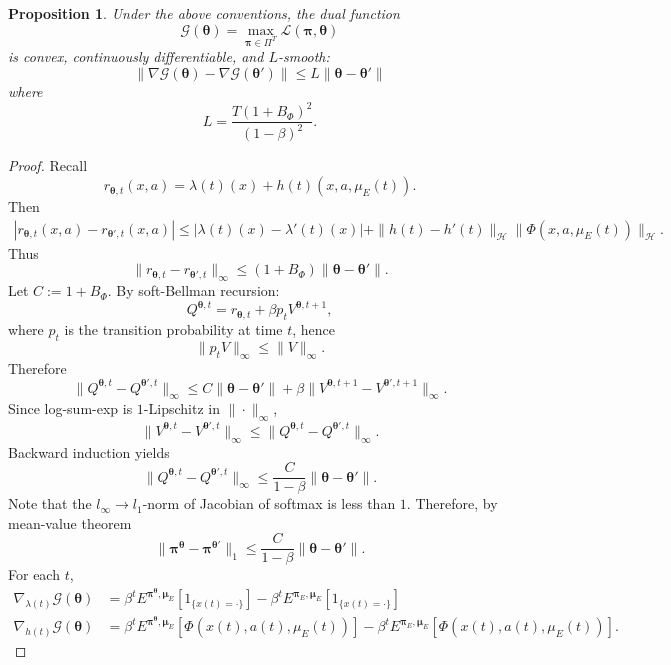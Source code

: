 \documentclass[11pt]{article}
\newcommand{\bmu}{{\boldsymbol \mu}}
\newcommand{\bpi}{{\boldsymbol \pi}}
\newtheorem{proposition}{Proposition}[section]
\begin{document}
\begin{proposition}
Under the above conventions, the dual function
\[
\mathcal G(\boldsymbol\theta)
=
\max_{\boldsymbol\pi\in\Pi^T}
\mathcal L(\boldsymbol\pi,\boldsymbol\theta)
\]
is convex, continuously differentiable, and $L$-smooth:
\[
\|\nabla\mathcal G(\boldsymbol\theta)
-
\nabla\mathcal G(\boldsymbol\theta')\|
\le
L
\|\boldsymbol\theta-\boldsymbol\theta'\|
\]
where 
\[ L = \frac{T(1+B_\Phi)^2}{(1-\beta)^2}. \]
\end{proposition}

\begin{proof}
Recall
\[
r_{\boldsymbol\theta,t}(x,a)
=
\lambda(t)(x)
+
h(t)(x,a,\mu_E(t)).
\]
Then
\begin{align*}
|r_{\boldsymbol\theta,t}(x,a)
-
r_{\boldsymbol\theta',t}(x,a)|
\le
|\lambda(t)(x)-\lambda'(t)(x)| +
\|h(t)-h'(t)\|_{\mathcal H}
\|\Phi(x,a,\mu_E(t))\|_{\mathcal H}.
\end{align*}
Thus
\[
\|r_{\boldsymbol\theta,t}
-
r_{\boldsymbol\theta',t}\|_\infty
\le
(1+B_\Phi)
\|\boldsymbol\theta-\boldsymbol\theta'\|.
\]
Let $C:=1+B_\Phi$. By soft-Bellman recursion:
\[
Q^{\boldsymbol\theta,t}
=
r_{\boldsymbol\theta,t}
+
\beta p_t V^{\boldsymbol\theta,t+1},
\]
where $p_t$ is the transition probability at time $t$, hence
\[
\|p_t V\|_\infty \le \|V\|_\infty.
\]
Therefore
\[
\|Q^{\boldsymbol\theta,t}
-
Q^{\boldsymbol\theta',t}\|_\infty
\le
C\|\boldsymbol\theta-\boldsymbol\theta'\|
+
\beta
\|V^{\boldsymbol\theta,t+1}
-
V^{\boldsymbol\theta',t+1}\|_\infty.
\]
Since log-sum-exp is $1$-Lipschitz in $\|\cdot\|_\infty$,
\[
\|V^{\boldsymbol\theta,t}
-
V^{\boldsymbol\theta',t}\|_\infty
\le
\|Q^{\boldsymbol\theta,t}
-
Q^{\boldsymbol\theta',t}\|_\infty.
\]
Backward induction yields
\[
\|Q^{\boldsymbol\theta,t}
-
Q^{\boldsymbol\theta',t}\|_\infty
\le
\frac{C}{1-\beta}
\|\boldsymbol\theta-\boldsymbol\theta'\|.
\]
Note that the $l_{\infty} \to l_1$-norm of Jacobian of softmax is less than $1$. Therefore, by mean-value theorem
\[
\|\boldsymbol\pi^{\boldsymbol\theta}
-
\boldsymbol\pi^{\boldsymbol\theta'}\|_{1}
\le
\frac{C}{1-\beta}
\|\boldsymbol\theta-\boldsymbol\theta'\|.
\]
For each $t$,
\begin{align*}
\nabla_{\lambda(t)}
\mathcal G(\boldsymbol\theta)
&=
\beta^t
E^{\boldsymbol\pi^{\boldsymbol\theta},\bmu_E}
[1_{\{x(t) = \cdot\}}] - \beta^t
E^{\bpi_E,\bmu_E}
[1_{\{x(t) = \cdot\}}] \\
\nabla_{h(t)}
\mathcal G(\boldsymbol\theta) 
&=
\beta^t
E^{\boldsymbol\pi^{\boldsymbol\theta},\bmu_E}
[\Phi(x(t),a(t),\mu_E(t))] - \beta^t
E^{\bpi_E,\bmu_E}
[\Phi(x(t),a(t),\mu_E(t))].
\end{align*}


\end{proof}
\end{document}
